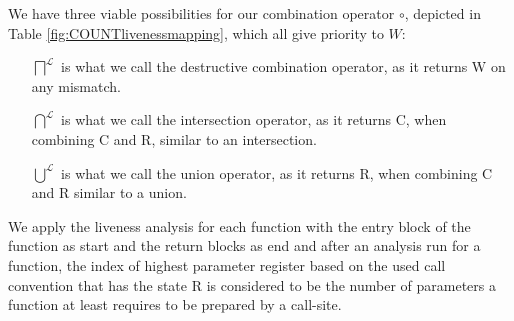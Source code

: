 We have three viable possibilities for our combination operator $\circ$, depicted in Table \ref{fig:COUNTlivenessmapping}, which all give priority to $W$:
\begin{itemize}
\item [$\bigsqcap^{\mathcal{L}}$] is what we call the destructive combination operator, as it returns W on any mismatch.
\item [$\bigcap^{\mathcal{L}}$] is what we call the intersection operator, as it returns C, when combining C and R, similar to an intersection.
\item [$\bigcup^{\mathcal{L}}$] is what we call the union operator, as it returns R, when combining C and R similar to a union.
\end{itemize}



\begin{table}

{}
\caption{Different mappings for combining two liveness state values in horizontal matching for the \emph{count} policy.}

\label{fig:COUNTlivenessmapping}
\end{table}

We apply the liveness analysis for each function with the entry block of the function as start and the return blocks as end and after an 
analysis run for a function, the index of highest parameter register based on the used call convention that has the state R is considered
to be the number of parameters a function at least requires to be prepared by a call-site.


